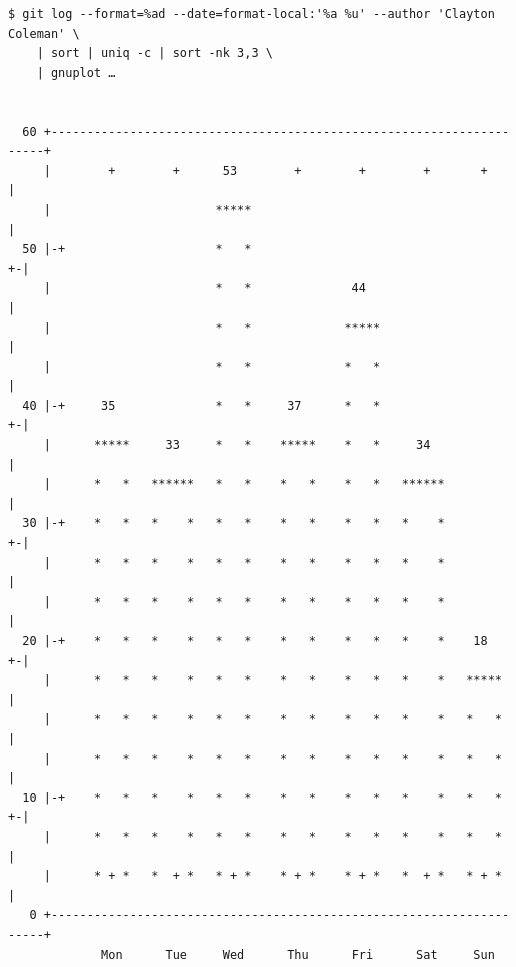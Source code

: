 \begin{frame}[fragile]
    \autotitle
    \tiny
    \begin{verbatim}
$ git log --format=%ad --date=format-local:'%a %u' --author 'Clayton Coleman' \
    | sort | uniq -c | sort -nk 3,3 \
    | gnuplot …


  60 +---------------------------------------------------------------------+
     |        +        +      53        +        +        +       +        |
     |                       *****                                         |
  50 |-+                     *   *                                       +-|
     |                       *   *              44                         |
     |                       *   *             *****                       |
     |                       *   *             *   *                       |
  40 |-+     35              *   *     37      *   *                     +-|
     |      *****     33     *   *    *****    *   *     34                |
     |      *   *   ******   *   *    *   *    *   *   ******              |
  30 |-+    *   *   *    *   *   *    *   *    *   *   *    *            +-|
     |      *   *   *    *   *   *    *   *    *   *   *    *              |
     |      *   *   *    *   *   *    *   *    *   *   *    *              |
  20 |-+    *   *   *    *   *   *    *   *    *   *   *    *    18      +-|
     |      *   *   *    *   *   *    *   *    *   *   *    *   *****      |
     |      *   *   *    *   *   *    *   *    *   *   *    *   *   *      |
     |      *   *   *    *   *   *    *   *    *   *   *    *   *   *      |
  10 |-+    *   *   *    *   *   *    *   *    *   *   *    *   *   *    +-|
     |      *   *   *    *   *   *    *   *    *   *   *    *   *   *      |
     |      * + *   *  + *   * + *    * + *    * + *   *  + *   * + *      |
   0 +---------------------------------------------------------------------+
             Mon      Tue     Wed      Thu      Fri      Sat     Sun
    \end{verbatim} %
\end{frame}
